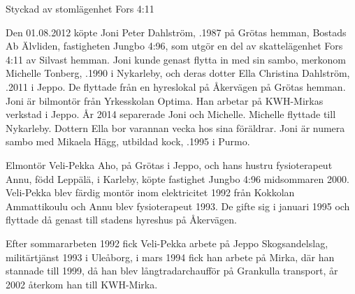 %

Styckad av stomlägenhet Fors 4:11


%
Den 01.08.2012 köpte Joni Peter Dahlström, .1987 på Grötas hemman, Bostads Ab Älvliden, fastigheten Jungbo 4:96, som	utgör en del av skattelägenhet Fors 4:11 av Silvast hemman. Joni kunde	genast flytta in med sin sambo, merkonom Michelle Tonberg, .1990 i Nykarleby, och deras dotter Ella Christina Dahlström, .2011 i Jeppo. De flyttade från en hyreslokal på Åkervägen på 	Grötas hemman. Joni är bilmontör från Yrkesskolan Optima. Han arbetar på KWH-Mirkas verkstad i Jeppo. År 2014 separerade Joni och Michelle. Michelle flyttade till Nykarleby. Dottern Ella bor varannan vecka hos sina föräldrar. Joni är numera sambo med Mikaela Hägg, utbildad kock, 	.1995 i Purmo.


%
Elmontör Veli-Pekka Aho,  på Grötas i Jeppo, och hans hustru fysioterapeut Annu, född Leppälä,  i Karleby, köpte fastighet Jungbo 4:96 midsommaren 2000. Veli-Pekka blev färdig montör inom elektricitet 1992 från Kokkolan Ammattikoulu och Annu blev fysioterapeut 1993. De gifte sig i januari 1995 och flyttade då genast till stadens hyreshus på Åkervägen.

Efter sommararbeten 1992 fick Veli-Pekka arbete på Jeppo Skogsandelslag, militärtjänst 1993 i Uleåborg, i mars 1994 fick han arbete på Mirka, där han stannade till 1999, då han blev långtradarchaufför på Grankulla transport, år 2002 återkom han till KWH-Mirka.

